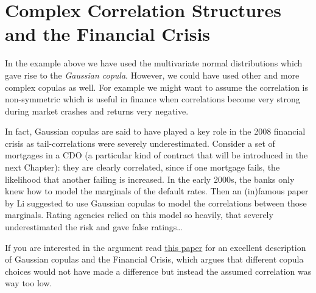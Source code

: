 \section{Complex Correlation Structures and the Financial
Crisis}\label{complex-correlation-structures-and-the-financial-crisis}

In the example above we have used the multivariate normal distributions which gave
rise to the \emph{Gaussian copula}. However, we could have used other and more complex
copulas as well. For example we might want to assume the correlation is
non-symmetric which is useful in finance when correlations become
very strong during market crashes and returns very negative.

In fact, Gaussian copulas are said to have played a key role in the 2008
financial crisis as tail-correlations were severely underestimated.
Consider a set of mortgages in a CDO (a particular kind of contract that will be introduced in the next Chapter): they are clearly correlated, since if one mortgage fails,
the likelihood that another failing is increased. In the early 2000s,
the banks only knew how to model the marginals of the default rates. Then an
(in)famous paper by Li suggested to use Gaussian copulas to model the
correlations between those marginals. Rating agencies relied on this model so heavily, that severely underestimated the risk and gave false ratings\ldots{}

If you are interested in the argument read
\href{http://samueldwatts.com/wp-content/uploads/2016/08/Watts-Gaussian-Copula_Financial_Crisis.pdf}{this paper}
for an excellent description of Gaussian copulas and the Financial
Crisis, which argues that different copula choices would not have made a
difference but instead the assumed correlation was way too low.
